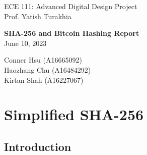 \documentclass{article}
\begin{document}
\begin{titlepage}
   \begin{center}

       \large ECE 111: Advanced Digital Design Project \\
       Prof. Yatish Turakhia
       \vfill

       \LARGE\textbf{SHA-256 and Bitcoin Hashing Report} \\
   \vspace{0.8cm}
       \large June 10, 2023 \\

       \vfill

       Conner Hsu (A16665092) \\
       Haozhang Chu (A16484292) \\
       Kirtan Shah (A16227067)

       \date{\today}

   \end{center}
\end{titlepage}

\tableofcontents

\newpage
\section{Simplified SHA-256}

\subsection{Introduction}

\end{document}
